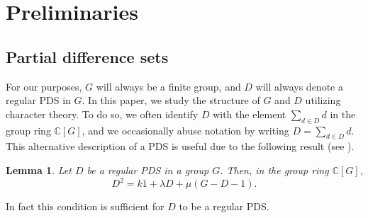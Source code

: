 \documentclass[12pt]{amsproc} %
\newtheorem{lem}[thm]{Lemma}
\theoremstyle{definition}\newtheorem{defn}[thm]{Definition}
\theoremstyle{definition}\newtheorem{rem}[thm]{Remark}
\theoremstyle{definition}\newtheorem{ex}[thm]{Example}
\newcommand{\C}{\mathbb{C}}
\begin{document}


\section{Preliminaries}
\label{sect:prelims}

\subsection{Partial difference sets}

 For our purposes, $G$ will always be a finite group, and $D$ will always denote a regular PDS in $G$. In this paper, we study the structure of $G$ and $D$ utilizing character theory. To do so, we often identify $D$ with the element $\sum_{d\in D} d$ in the group ring $\C[G]$, and we occasionally abuse notation by writing $D = \sum_{d\in D} d$. This alternative description of a PDS is useful due to the following result (see \cite[Theorem 1.3]{ma}).

\begin{lem}\label{D-squared}
	Let $D$ be a regular PDS in a group $G$. Then, in the group ring $\C[G]$,
		\begin{equation*}
			D^2 = k1 + \lambda D + \mu (G - D - 1).
		\end{equation*}
\end{lem}

\noindent In fact this condition is sufficient for $D$ to be a regular PDS.
\end{document}

